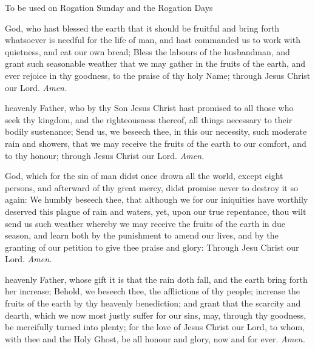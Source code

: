 \begin{rubric}
	{To be used on Rogation Sunday and the Rogation Days}
\end{rubric}
 God, who hast blessed the earth that it should be fruitful and bring forth whatsoever is needful for the life of man, and hast commanded us to work with quietness, and eat our own bread; Bless the labours of the husbandman, and grant such seasonable weather that we may gather in the fruits of the earth, and ever rejoice in thy goodness, to the praise of thy holy Name; through Jesus Christ our Lord. \textit{Amen.}

 heavenly Father, who by thy Son Jesus Christ hast promised to all those who seek thy kingdom, and the righteousness thereof, all things necessary to their bodily sustenance; Send us, we beseech thee, in this our necessity, such moderate rain and showers, that we may receive the fruits of the earth to our comfort, and to thy honour; through Jesus Christ our Lord. \textit{Amen.}

 God, which for the sin of man didst once drown all the world, except eight persons, and afterward of thy great mercy, didst promise never to destroy it so again: We humbly beseech thee, that although we for our iniquities have worthily deserved this plague of rain and waters, yet, upon our true repentance, thou wilt send us such weather whereby we may receive the fruits of the earth in due season, and learn both by the punishment to amend our lives, and by the granting of our petition to give thee praise and glory: Through Jesu Christ our Lord. \textit{Amen.}

 heavenly Father, whose gift it is that the rain doth fall, and the earth bring forth her increase; Behold, we beseech thee, the afflictions of thy people; increase the fruits of the earth by thy heavenly benediction; and grant that the scarcity and dearth, which we now most justly suffer for our sins, may, through thy goodness, be mercifully turned into plenty; for the love of Jesus Christ our Lord, to whom, with thee and the Holy Ghost, be all honour and glory, now and for ever. \textit{Amen.}

